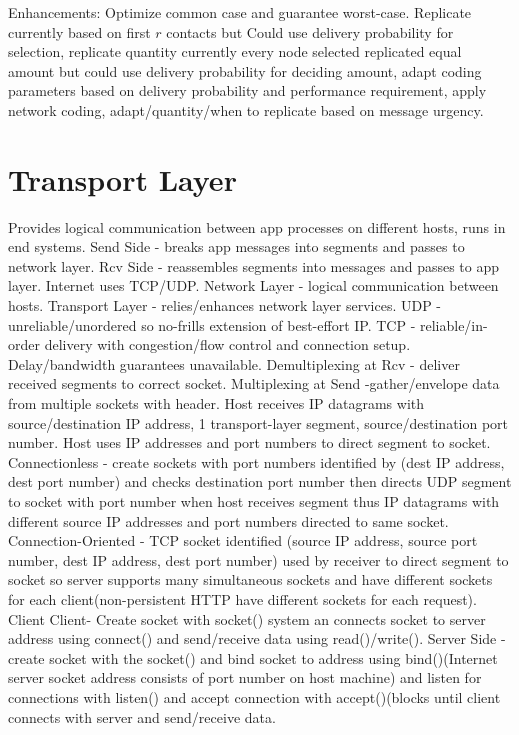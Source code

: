 \documentclass[8pt]{extarticle}
\begin{document}
\begin{multicols}{2}
Enhancements: Optimize common case and guarantee worst-case. Replicate currently based on first $r$ contacts but Could use delivery probability for selection, replicate quantity currently every node selected replicated equal amount but could use delivery probability for deciding amount, adapt coding parameters based on delivery probability and performance requirement, apply network coding, adapt/quantity/when to replicate based on message urgency.

\section{Transport Layer}

Provides logical communication between app processes on different hosts, runs in end systems. Send Side - breaks app messages into segments and passes to network layer. Rcv Side - reassembles segments into messages and passes to app layer. Internet uses TCP/UDP. Network Layer - logical communication between hosts. Transport Layer - relies/enhances network layer services. UDP - unreliable/unordered so no-frills extension of best-effort IP. TCP - reliable/in-order delivery with congestion/flow control and connection setup. Delay/bandwidth guarantees unavailable. Demultiplexing at Rcv - deliver received segments to correct socket. Multiplexing at Send -gather/envelope data from multiple sockets with header. Host receives IP datagrams with source/destination IP address, 1 transport-layer segment, source/destination port number. Host uses IP addresses and port numbers to direct segment to socket. Connectionless - create sockets with port numbers identified by (dest IP address, dest port number) and checks destination port number then directs UDP segment to socket with port number when host receives segment thus IP datagrams with different source IP addresses and port numbers directed to same socket. Connection-Oriented - TCP socket identified (source IP address, source port number, dest IP address, dest port number) used by receiver to direct segment to socket so server supports many simultaneous sockets and have different sockets for each client(non-persistent HTTP have different sockets for each request). Client Client- Create socket with socket() system an connects socket to server address using connect() and send/receive data using read()/write(). Server Side - create socket with the socket() and bind socket to address using bind()(Internet server socket address consists of port number on host machine) and listen for connections with listen() and accept connection with accept()(blocks until client connects with server and send/receive data.


\end{multicols}
\end{document}

